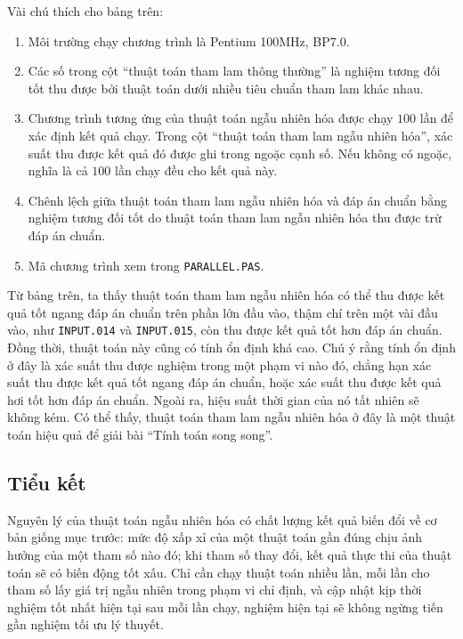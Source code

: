 \documentclass[11pt]{article}
\begin{document}
Vài chú thích cho bảng trên:
\begin{enumerate}
  \item Môi trường chạy chương trình là Pentium 100MHz, BP7.0.
  \item Các số trong cột ``thuật toán tham lam thông thường'' là nghiệm tương
  đối tốt thu được bởi thuật toán dưới nhiều tiêu chuẩn tham lam khác nhau.
  \item Chương trình tương ứng của thuật toán ngẫu nhiên hóa được chạy \(100\)
  lần để xác định kết quả chạy. Trong cột ``thuật toán tham lam ngẫu nhiên
  hóa'', xác suất thu được kết quả đó được ghi trong ngoặc cạnh số. Nếu không
  có ngoặc, nghĩa là cả \(100\) lần chạy đều cho kết quả này.
  \item Chênh lệch giữa thuật toán tham lam ngẫu nhiên hóa và đáp án chuẩn
  bằng nghiệm tương đối tốt do thuật toán tham lam ngẫu nhiên hóa thu được trừ
  đáp án chuẩn.
  \item Mã chương trình xem trong \texttt{PARALLEL.PAS}.
\end{enumerate}

Từ bảng trên, ta thấy thuật toán tham lam ngẫu nhiên hóa có thể thu được kết
quả tốt ngang đáp án chuẩn trên phần lớn đầu vào, thậm chí trên một vài đầu
vào, như \texttt{INPUT.014} và \texttt{INPUT.015}, còn thu được kết quả tốt
hơn đáp án chuẩn. Đồng thời, thuật toán này cũng có tính ổn định khá cao. Chú
ý rằng tính ổn định ở đây là xác suất thu được nghiệm trong một phạm vi nào
đó, chẳng hạn xác suất thu được kết quả tốt ngang đáp án chuẩn, hoặc xác suất
thu được kết quả hơi tốt hơn đáp án chuẩn. Ngoài ra, hiệu suất thời gian của
nó tất nhiên sẽ không kém. Có thể thấy, thuật toán tham lam ngẫu nhiên hóa ở
đây là một thuật toán hiệu quả để giải bài ``Tính toán song song''.

\subsection{Tiểu kết}

Nguyên lý của thuật toán ngẫu nhiên hóa có chất lượng kết quả biến đổi về cơ
bản giống mục trước: mức độ xấp xỉ của một thuật toán gần đúng chịu ảnh hưởng
của một tham số nào đó; khi tham số thay đổi, kết quả thực thi của thuật toán
sẽ có biến động tốt xấu. Chỉ cần chạy thuật toán nhiều lần, mỗi lần cho tham
số lấy giá trị ngẫu nhiên trong phạm vi chỉ định, và cập nhật kịp thời nghiệm
tốt nhất hiện tại sau mỗi lần chạy, nghiệm hiện tại sẽ không ngừng tiến gần
nghiệm tối ưu lý thuyết.
\end{document}
